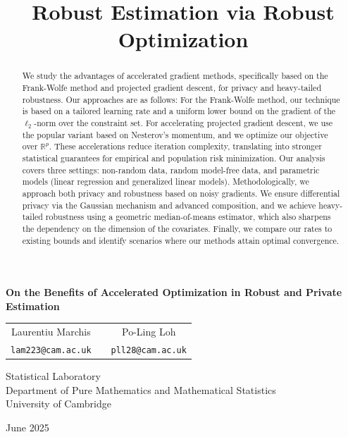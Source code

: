 \documentclass{article}
\title{Robust Estimation via Robust Optimization}
\author{}
\date{}
\begin{document}
\begin{center}
{\bf{\LARGE{On the Benefits of Accelerated Optimization in Robust and Private Estimation}}} \\
\vspace*{.25in}
\begin{tabular}{ccc}
{\large{Laurentiu Marchis}} & \hspace*{.5in}  & {\large{Po-Ling Loh}}\\
{\large{\texttt{lam223@cam.ac.uk}}} & \hspace*{.5in} & {\large{\texttt{pll28@cam.ac.uk}}}
\end{tabular}
\begin{center}
Statistical Laboratory \\
Department of Pure Mathematics and Mathematical Statistics \\
University of Cambridge
\end{center}
\vspace*{.2in}
June 2025
\vspace*{.2in}
\end{center}

\begin{abstract}
We study the advantages of accelerated gradient methods, specifically based on the Frank-Wolfe method and projected gradient descent, for privacy and heavy-tailed robustness. Our approaches are as follows: For the Frank-Wolfe method, our technique is based on a tailored learning rate and a uniform lower bound on the gradient of the $\ell_2$-norm over the constraint set. For accelerating projected gradient descent, we use the popular variant based on Nesterov's momentum, and we optimize our objective over $\mathbb{R}^p$. These accelerations reduce iteration complexity, translating into stronger statistical guarantees for empirical and population risk minimization. Our analysis covers three settings: non-random data, random model-free data, and parametric models (linear regression and generalized linear models). Methodologically, we approach both privacy and robustness based on noisy gradients. We ensure differential privacy via the Gaussian mechanism and advanced composition, and we achieve heavy-tailed robustness using a geometric median-of-means estimator, which also sharpens the dependency on the dimension of the covariates. Finally, we compare our rates to existing bounds and identify scenarios where our methods attain optimal convergence.
\end{abstract}

\end{document}
